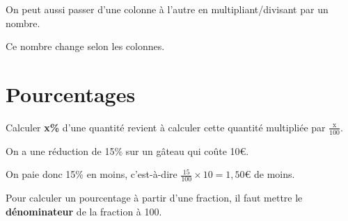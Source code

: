 \documentclass[a4paper,11pt]{article}
\begin{document}
\begin{greybox}[frametitle={Remarque}]
	On peut aussi passer d'une colonne à l'autre en multipliant/divisant par un nombre.

	Ce nombre change selon les colonnes.
\end{greybox}

\section{Pourcentages}

\begin{cours}
	Calculer \textbf{x\%} d'une quantité revient à calculer cette quantité multipliée par $\frac{\text{x}}{100}$.
\end{cours}

\begin{exemple}
	On a une réduction de 15\% sur un gâteau qui coûte 10€.

	On paie donc 15\% en moins, c'est-à-dire $\frac{15}{100} × 10 = 1,50€$ de moins.
\end{exemple}

\begin{cours}
	Pour calculer un pourcentage à partir d'une fraction, il faut mettre le \textbf{dénominateur} de la fraction à 100.
\end{cours}
\end{document}
